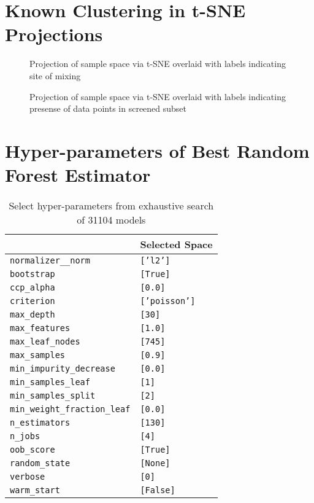 \section*{Known Clustering in t-SNE Projections}
\label{sec:org4aa92f2}
 
\begin{figure}[htbp]
\centering

\caption{\label{fig:alloys} Projection of sample space via t-SNE overlaid with labels indicating site of mixing}
\end{figure}

 
\begin{figure}[htbp]
\centering

\caption{\label{fig:chosen} Projection of sample space via t-SNE overlaid with labels indicating presense of data points in screened subset}
\end{figure}

\section*{Hyper-parameters of Best Random Forest Estimator}
\label{sec:org6b04a78}

\begin{table}[htbp]
\caption{\label{tbl:rfrHPO} Select hyper-parameters from exhaustive search of 31104 models}
\centering
\begin{tabular}{ll}
 & Selected Space\\[0pt]
\hline
\texttt{normalizer\_\_norm} & \texttt{['l2']}\\[0pt]
\texttt{bootstrap} & \texttt{[True]}\\[0pt]
\texttt{ccp\_alpha} & \texttt{[0.0]}\\[0pt]
\texttt{criterion} & \texttt{['poisson']}\\[0pt]
\texttt{max\_depth} & \texttt{[30]}\\[0pt]
\texttt{max\_features} & \texttt{[1.0]}\\[0pt]
\texttt{max\_leaf\_nodes} & \texttt{[745]}\\[0pt]
\texttt{max\_samples} & \texttt{[0.9]}\\[0pt]
\texttt{min\_impurity\_decrease} & \texttt{[0.0]}\\[0pt]
\texttt{min\_samples\_leaf} & \texttt{[1]}\\[0pt]
\texttt{min\_samples\_split} & \texttt{[2]}\\[0pt]
\texttt{min\_weight\_fraction\_leaf} & \texttt{[0.0]}\\[0pt]
\texttt{n\_estimators} & \texttt{[130]}\\[0pt]
\texttt{n\_jobs} & \texttt{[4]}\\[0pt]
\texttt{oob\_score} & \texttt{[True]}\\[0pt]
\texttt{random\_state} & \texttt{[None]}\\[0pt]
\texttt{verbose} & \texttt{[0]}\\[0pt]
\texttt{warm\_start} & \texttt{[False]}\\[0pt]
\end{tabular}
\end{table}
